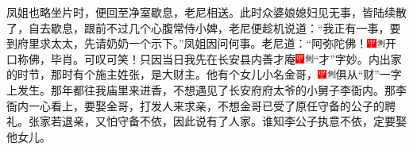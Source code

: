 凤姐也略坐片时，便回至净室歇息，老尼相送。此时众婆娘媳妇见无事，皆陆续散了，自去歇息，跟前不过几个心腹常侍小婢，老尼便趁机说道：``我正有一事，要到府里求太太，先请奶奶一个示下。''凤姐因问何事。老尼道：``阿弥陀佛！{\includegraphics[width=3mm]{../Images/00002}\includegraphics[width=3mm]{../Images/00011}\footnotesize \kaishu 开口称佛，毕肖。可叹可笑！}只因当日我先在长安县内善才庵{\includegraphics[width=3mm]{../Images/00002}\includegraphics[width=3mm]{../Images/00011}\footnotesize \kaishu ``才''字妙。}内出家的时节，那时有个施主姓张，是大财主。他有个女儿小名金哥，{\includegraphics[width=3mm]{../Images/00002}\includegraphics[width=3mm]{../Images/00011}\footnotesize \kaishu 俱从``财''一字上发生。}那年都往我庙里来进香，不想遇见了长安府府太爷的小舅子李衙内。那李衙内一心看上，要娶金哥，打发人来求亲，不想金哥已受了原任守备的公子的聘礼。张家若退亲，又怕守备不依，因此说有了人家。谁知李公子执意不依，定要娶他女儿。